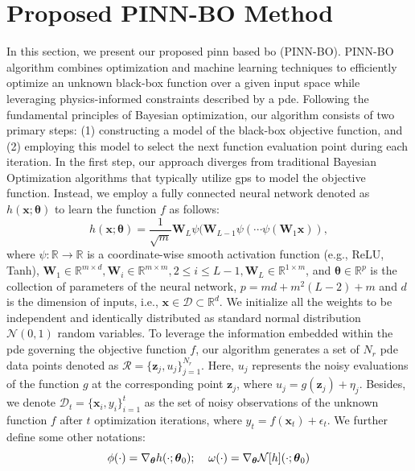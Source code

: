 \section{Proposed PINN-BO Method}
\label{section:pinn-bo_proposed_method}
In this section, we present our proposed \ac{pinn} based \acl{bo} (PINN-BO). PINN-BO algorithm combines optimization and machine learning techniques to efficiently optimize an unknown black-box function over a given input space while leveraging physics-informed constraints described by a \ac{pde}. Following the fundamental principles of Bayesian optimization, our algorithm consists of two primary steps: (1) constructing a model of the black-box objective function, and (2) employing this model to select the next function evaluation point during each iteration. In the first step, our approach diverges from traditional Bayesian Optimization algorithms that typically utilize \acfp{gp} to model the objective function. Instead, we employ a fully connected neural network denoted as $h(\mathbf{x}; \boldsymbol{\theta})$ to learn the function $f$ as follows:
\[
h(\mathbf{x};\boldsymbol{\theta}) = \frac{1}{\sqrt{m}} \mathbf{W}_L \psi(\mathbf{W}_{L-1}\psi(\cdots \psi(\mathbf{W}_1 \mathbf{x})),
\]
where $\psi\colon \mathbb{R} \rightarrow \mathbb{R}$ is a coordinate-wise smooth activation function (e.g., ReLU, Tanh), $\mathbf{W}_1 \in \mathbb{R}^{m \times d}, \mathbf{W}_i \in \mathbb{R}^{m \times m}, 2\leq i \leq L-1, \mathbf{W}_L \in \mathbb{R}^{1 \times m}$, and $\boldsymbol{\theta} \in \mathbb{R}^p$ is the collection of parameters of the neural network, $p=md+m^2(L-2)+m$ and $d$ is the dimension of inputs, i.e., $\mathbf{x} \in \mathcal{D} \subset \mathbb{R}^d$. We initialize all the weights to be independent and identically distributed as standard normal distribution $\mathcal{N}(0,1)$ random variables. To leverage the information embedded within the \ac{pde} governing the objective function $f$, our algorithm generates a set of $N_r$ \ac{pde} data points denoted as $\mathcal{R} =  \{\mathbf{z}_j, u_j\}_{j=1}^{N_r}$. Here, $u_j$ represents the noisy evaluations of the function $g$ at the corresponding point $\mathbf{z}_j$, where $u_j = g(\mathbf{z}_j) + \eta_j$. Besides, we denote $\mathcal{D}_t = \{\mathbf{x}_i, y_i\}_{i=1}^t$ as the set of noisy observations of the unknown function $f$ after $t$ optimization iterations, where $y_t = f(\mathbf{x}_t) + \epsilon_t$. We further define some other notations:
\begin{equation*}
        \phi(\cdot) = \nabla_{\boldsymbol{\theta}} h(\cdot; \boldsymbol{\theta}_0) ; \; \; \; \;
        \omega(\cdot)  = \nabla_{\boldsymbol{\theta}} \mathcal{N}[h] (\cdot; \boldsymbol{\theta}_0)\\
\end{equation*}

